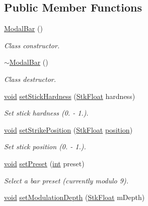 \subsection*{Public Member Functions}
\begin{DoxyCompactItemize}
\item 
\hyperlink{class_nyq_1_1_modal_bar_ae2f86e24a056630d75e96bb9aa9366fc}{Modal\+Bar} ()
\begin{DoxyCompactList}\small\item\em Class constructor. \end{DoxyCompactList}\item 
\hyperlink{class_nyq_1_1_modal_bar_a565348bda863ab887f7627e90218cd48}{$\sim$\+Modal\+Bar} ()
\begin{DoxyCompactList}\small\item\em Class destructor. \end{DoxyCompactList}\item 
\hyperlink{sound_8c_ae35f5844602719cf66324f4de2a658b3}{void} \hyperlink{class_nyq_1_1_modal_bar_a43abec0a14af150fba7b86bac8974db1}{set\+Stick\+Hardness} (\hyperlink{namespace_nyq_a044fa20a706520a617bbbf458a7db7e4}{Stk\+Float} hardness)
\begin{DoxyCompactList}\small\item\em Set stick hardness (0. -\/ 1.). \end{DoxyCompactList}\item 
\hyperlink{sound_8c_ae35f5844602719cf66324f4de2a658b3}{void} \hyperlink{class_nyq_1_1_modal_bar_acda131ea9ca1ad2ab4c0ad261a28e21d}{set\+Strike\+Position} (\hyperlink{namespace_nyq_a044fa20a706520a617bbbf458a7db7e4}{Stk\+Float} \hyperlink{structposition}{position})
\begin{DoxyCompactList}\small\item\em Set stick position (0. -\/ 1.). \end{DoxyCompactList}\item 
\hyperlink{sound_8c_ae35f5844602719cf66324f4de2a658b3}{void} \hyperlink{class_nyq_1_1_modal_bar_a252e0cdad92c38bc87d6bf79065b0cd5}{set\+Preset} (\hyperlink{xmltok_8h_a5a0d4a5641ce434f1d23533f2b2e6653}{int} preset)
\begin{DoxyCompactList}\small\item\em Select a bar preset (currently modulo 9). \end{DoxyCompactList}\item 
\hyperlink{sound_8c_ae35f5844602719cf66324f4de2a658b3}{void} \hyperlink{class_nyq_1_1_modal_bar_a3d4a9efc61d3cd35ec2595b3e73ea9f2}{set\+Modulation\+Depth} (\hyperlink{namespace_nyq_a044fa20a706520a617bbbf458a7db7e4}{Stk\+Float} m\+Depth)

\end{DoxyCompactItemize}
